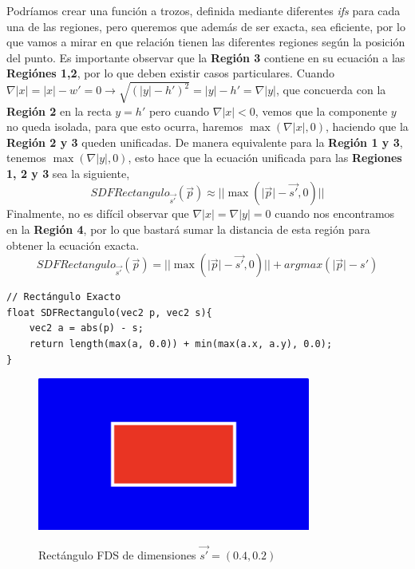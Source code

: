 Podríamos crear una función a trozos, definida mediante diferentes \textit{ifs} para cada una de las regiones, pero queremos que además de ser exacta, sea eficiente, por lo que vamos a mirar en que relación tienen las diferentes regiones según la posición del punto. Es importante observar que la \textbf{Región 3} contiene en su ecuación a las \textbf{Regiónes 1,2}, por lo que deben existir casos particulares. Cuando \(\nabla \vert x\vert =\vert x\vert-w'=0\longrightarrow \sqrt{\left(\vert y\vert-h'\right)^2} = \vert y\vert-h'=\nabla \vert y\vert\), que concuerda con la \textbf{Región 2} en la recta \(y=h'\) pero cuando \(\nabla \vert x\vert < 0\), vemos que la componente \(y\) no queda isolada, para que esto ocurra, haremos \(\max\left(\nabla \vert x\vert, 0\right)\), haciendo que la \textbf{Región 2 y 3} queden unificadas. De manera equivalente para la \textbf{Región 1 y 3}, tenemos \(\max\left(\nabla \vert y\vert, 0\right)\), esto hace que la ecuación unificada para las \textbf{Regiones 1, 2 y 3} sea la siguiente,
\[SDFRectangulo_{\Vec{s'}}(\Vec{p})\approx \vert\vert\max\left(\vert\Vec{p}\vert-\Vec{s'},0\right)\vert\vert\]
Finalmente, no es difícil observar que \(\nabla\vert x\vert=\nabla\vert y\vert=0\) cuando nos encontramos en la \textbf{Región 4}, por lo que bastará sumar la distancia de esta región para obtener la ecuación exacta.
\[SDFRectangulo_{\Vec{s'}}(\Vec{p})= \vert\vert\max\left(\vert\Vec{p}\vert-\Vec{s'},0\right)\vert\vert + argmax(\vert \Vec{p}\vert - {s'})\]
\begin{lstlisting}
// Rectángulo Exacto
float SDFRectangulo(vec2 p, vec2 s){
    vec2 a = abs(p) - s;
    return length(max(a, 0.0)) + min(max(a.x, a.y), 0.0);
}
\end{lstlisting}
\begin{figure}[H]
  \centering
  \captionsetup{justification=centering}%
  \includegraphics[width=0.8\textwidth]{secciones/imagenes/sdf_rectangulo.jpeg}\label{fig:rectaangulo}
  \caption{Rectángulo FDS de dimensiones \(\Vec{s'}=(0.4, 0.2)\)}
\end{figure}

